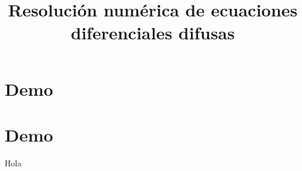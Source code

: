 \documentclass[twoside,11pt]{PlantillaTFG}
\title{Resolución numérica de ecuaciones diferenciales difusas}
\begin{document}
	\maketitle

	\frontmatter
	
		
	
	
	
	\tableofcontents
	
	\mainmatter

	\pagestyle{fancy}
	\chapter{Demo}
	\lipsum[1-10]
	
	\chapter{Demo}
	\lipsum[1-10]
	
	\begin{teorema}{}
		Hola
	\end{teorema}
\end{document}
